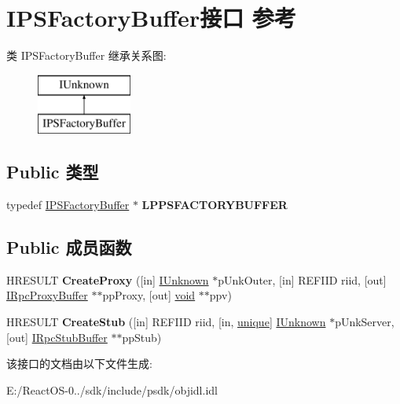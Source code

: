 \hypertarget{interface_i_p_s_factory_buffer}{}\section{I\+P\+S\+Factory\+Buffer接口 参考}
\label{interface_i_p_s_factory_buffer}
类 I\+P\+S\+Factory\+Buffer 继承关系图\+:\begin{figure}[H]
\begin{center}
\leavevmode
\includegraphics[height=2.000000cm]{interface_i_p_s_factory_buffer}
\end{center}
\end{figure}
\subsection*{Public 类型}
\begin{DoxyCompactItemize}
\item 
\mbox{\label{interface_i_p_s_factory_buffer_a21d09a330fd967b56cdb51f08742dfac}} 
typedef \hyperlink{interface_i_p_s_factory_buffer}{I\+P\+S\+Factory\+Buffer} $\ast$ {\bfseries L\+P\+P\+S\+F\+A\+C\+T\+O\+R\+Y\+B\+U\+F\+F\+ER}
\end{DoxyCompactItemize}
\subsection*{Public 成员函数}
\begin{DoxyCompactItemize}
\item 
\mbox{\label{interface_i_p_s_factory_buffer_aeb1dd05b8dd49e9955219c7e7fa43504}} 
H\+R\+E\+S\+U\+LT {\bfseries Create\+Proxy} (\mbox{[}in\mbox{]} \hyperlink{interface_i_unknown}{I\+Unknown} $\ast$p\+Unk\+Outer, \mbox{[}in\mbox{]} R\+E\+F\+I\+ID riid, \mbox{[}out\mbox{]} \hyperlink{interface_i_rpc_proxy_buffer}{I\+Rpc\+Proxy\+Buffer} $\ast$$\ast$pp\+Proxy, \mbox{[}out\mbox{]} \hyperlink{interfacevoid}{void} $\ast$$\ast$ppv)
\item 
\mbox{\label{interface_i_p_s_factory_buffer_acc9e40de43cabc18cb2ac1fb8176d9a1}} 
H\+R\+E\+S\+U\+LT {\bfseries Create\+Stub} (\mbox{[}in\mbox{]} R\+E\+F\+I\+ID riid, \mbox{[}in, \hyperlink{interfaceunique}{unique}\mbox{]} \hyperlink{interface_i_unknown}{I\+Unknown} $\ast$p\+Unk\+Server, \mbox{[}out\mbox{]} \hyperlink{interface_i_rpc_stub_buffer}{I\+Rpc\+Stub\+Buffer} $\ast$$\ast$pp\+Stub)
\end{DoxyCompactItemize}


该接口的文档由以下文件生成\+:\begin{DoxyCompactItemize}
\item 
E\+:/\+React\+O\+S-\/0../sdk/include/psdk/objidl.\+idl\end{DoxyCompactItemize}
